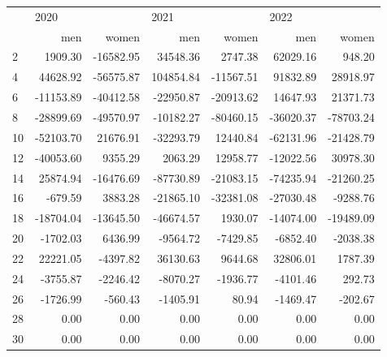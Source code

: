 \begin{tabular}{lrrrrrr}
\toprule
{} & \multicolumn{2}{l}{2020} & \multicolumn{2}{l}{2021} & \multicolumn{2}{l}{2022} \\
{} &       men &     women &        men &     women &       men &     women \\
\midrule
2  &   1909.30 & -16582.95 &   34548.36 &   2747.38 &  62029.16 &    948.20 \\
4  &  44628.92 & -56575.87 &  104854.84 & -11567.51 &  91832.89 &  28918.97 \\
6  & -11153.89 & -40412.58 &  -22950.87 & -20913.62 &  14647.93 &  21371.73 \\
8  & -28899.69 & -49570.97 &  -10182.27 & -80460.15 & -36020.37 & -78703.24 \\
10 & -52103.70 &  21676.91 &  -32293.79 &  12440.84 & -62131.96 & -21428.79 \\
12 & -40053.60 &   9355.29 &    2063.29 &  12958.77 & -12022.56 &  30978.30 \\
14 &  25874.94 & -16476.69 &  -87730.89 & -21083.15 & -74235.94 & -21260.25 \\
16 &   -679.59 &   3883.28 &  -21865.10 & -32381.08 & -27030.48 &  -9288.76 \\
18 & -18704.04 & -13645.50 &  -46674.57 &   1930.07 & -14074.00 & -19489.09 \\
20 &  -1702.03 &   6436.99 &   -9564.72 &  -7429.85 &  -6852.40 &  -2038.38 \\
22 &  22221.05 &  -4397.82 &   36130.63 &   9644.68 &  32806.01 &   1787.39 \\
24 &  -3755.87 &  -2246.42 &   -8070.27 &  -1936.77 &  -4101.46 &    292.73 \\
26 &  -1726.99 &   -560.43 &   -1405.91 &     80.94 &  -1469.47 &   -202.67 \\
28 &      0.00 &      0.00 &       0.00 &      0.00 &      0.00 &      0.00 \\
30 &      0.00 &      0.00 &       0.00 &      0.00 &      0.00 &      0.00 \\
\bottomrule
\end{tabular}
